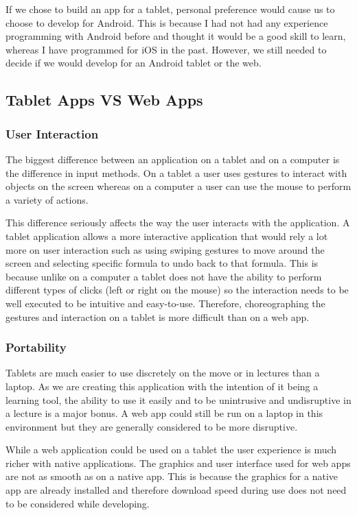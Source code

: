 \documentclass[draft]{report}
\begin{document}
If we chose to build an app for a tablet, personal preference would cause us to choose to develop for Android. This is because I had not had any experience programming with Android before and thought it would be a good skill to learn, whereas I have programmed for iOS in the past. However, we still needed to decide if we would develop for an Android tablet or the web.

\subsection{Tablet Apps VS Web Apps}

\subsubsection{User Interaction}

The biggest difference between an application on a tablet and on a computer is the difference in input methods. On a tablet a user uses gestures to interact with objects on the screen whereas on a computer a user can use the mouse to perform a variety of actions.

This difference seriously affects the way the user interacts with the application. A tablet application allows a more interactive application that would rely a lot more on user interaction such as using swiping gestures to move around the screen and selecting specific formula to undo back to that formula. This is because unlike on a computer a tablet does not have the ability to perform different types of clicks (left or right on the mouse) so the interaction needs to be well executed to be intuitive and easy-to-use. Therefore, choreographing the gestures and interaction on a tablet is more difficult than on a web app. 

\subsubsection{Portability}

Tablets are much easier to use discretely on the move or in lectures than a laptop. As we are creating this application with the intention of it being a learning tool, the ability to use it easily and to be unintrusive and undisruptive in a lecture is a major bonus. A web app could still be run on a laptop in this environment but they are generally considered to be more disruptive.

While a web application could be used on a tablet the user experience is much richer with native applications. The graphics and user interface used for web apps are not as smooth as on a native app. This is because the graphics for a native app are already installed and therefore download speed during use does not need to be considered while developing\cite{androidwebappdifferences}.
\end{document}
